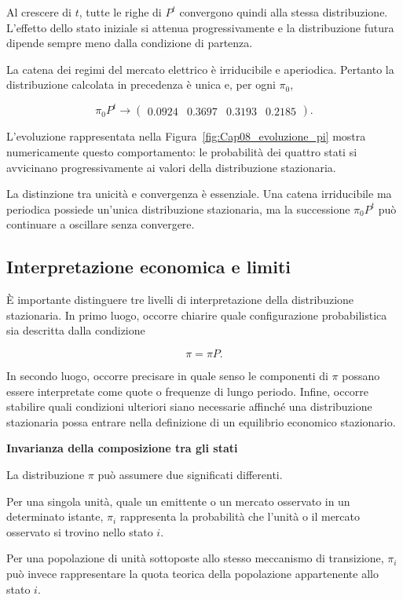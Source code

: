 Al crescere di \(t\), tutte le righe di \(P^t\) convergono quindi alla
stessa distribuzione. L'effetto dello stato iniziale si attenua
progressivamente e la distribuzione futura dipende sempre meno dalla
condizione di partenza.

La catena dei regimi del mercato elettrico \`{e} irriducibile e
aperiodica. Pertanto la distribuzione calcolata in precedenza \`{e}
unica e, per ogni \(\pi_0\),

\[
\pi_0P^t
\longrightarrow
\begin{pmatrix}
0.0924 & 0.3697 & 0.3193 & 0.2185
\end{pmatrix}.
\]

L'evoluzione rappresentata nella
Figura~\ref{fig:Cap08_evoluzione_pi} mostra numericamente questo
comportamento: le probabilit\`{a} dei quattro stati si avvicinano
progressivamente ai valori della distribuzione stazionaria.

La distinzione tra unicit\`{a} e convergenza \`{e} essenziale. Una
catena irriducibile ma periodica possiede un'unica distribuzione
stazionaria, ma la successione \(\pi_0P^t\) pu\`{o} continuare a
oscillare senza convergere.

\subsection{Interpretazione economica e limiti}

\`{E} importante distinguere tre livelli di
interpretazione della distribuzione stazionaria. In primo luogo,
occorre chiarire quale configurazione probabilistica sia descritta
dalla condizione

\[
\pi=\pi P.
\]

In secondo luogo, occorre precisare in quale senso le componenti di
\(\pi\) possano essere interpretate come quote o frequenze di lungo
periodo. Infine, occorre stabilire quali condizioni ulteriori siano
necessarie affinch\'{e} una distribuzione stazionaria possa entrare
nella definizione di un equilibrio economico stazionario.

\noindent\textbf{Invarianza della composizione tra gli stati}

La distribuzione \(\pi\) pu\`{o} assumere due significati differenti.

Per una singola unit\`{a}, quale un emittente o un mercato osservato in
un determinato istante, \(\pi_i\) rappresenta la probabilit\`{a} che
l'unit\`{a} o il mercato osservato si trovino nello stato \(i\).

Per una popolazione di unit\`{a} sottoposte allo stesso meccanismo di
transizione, \(\pi_i\) pu\`{o} invece rappresentare la quota teorica
della popolazione appartenente allo stato \(i\).

